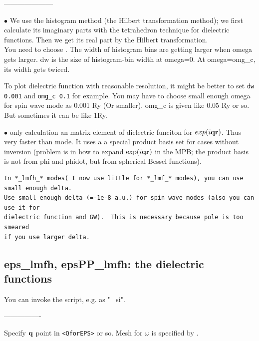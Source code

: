 ---------------------

\noindent $\bullet$ We use the histogram method (the Hilbert
transformation method); we first calculate its imaginary parts
  with the tetrahedron technique for dielectric functions. 
  Then we get its real part by the Hilbert transformation.\\
  You need to choose . 
  The width of histogram bins are getting larger when omega gets larger.
  dw is the size of histogram-bin width at omega=0. 
  At omega=omg\_c, its width gets twiced.

  To plot dielectric function with reasonable resolution, it might be
  better to set \verb#dw 0.001# and \verb#omg_c 0.1# for example.
  You may have to choose small enough omega 
  for spin wave mode as 0.001 Ry (Or smaller).
  omg\_c is given like 0.05 Ry or so. But sometimes it can be like 1Ry.

  
\noindent $\bullet$  only calculation an matrix element 
  of dielectric funciton for $exp(i {\bf q} {\bf r})$. Thus very faster 
  than  mode. 
  It uses a a special product basis set for cases without inversion
  (problem is in how to expand $\exp(i {\bf q} {\bf r})$ in the MPB;
   the product basis is not from phi and phidot, 
    but from spherical Bessel functions).\\



\begin{verbatim}
In *_lmfh_* modes( I now use little for *_lmf_* modes), you can use small enough delta.
Use small enough delta (=-1e-8 a.u.) for spin wave modes (also you can use it for 
dielectric function and GW).  This is necessary because pole is too smeared 
if you use larger delta.
\end{verbatim}



\subsection{eps\_lmfh, epsPP\_lmfh: the dielectric functions}

You can invoke the script, e.g. as " \ si".

----------------

Specify ${\bf q}$ point in \verb#<QforEPS># or so.
Mesh for $\omega$ is specified by .

